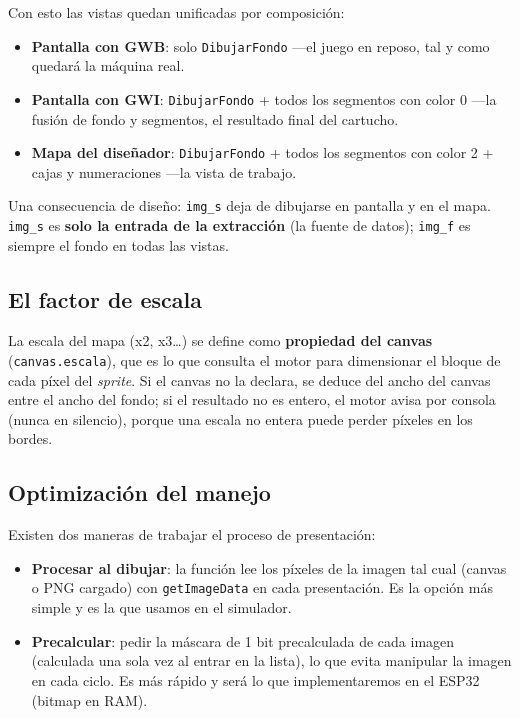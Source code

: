 Con esto las vistas quedan unificadas por composición:
\begin{itemize}
	\item \textbf{Pantalla con GWB}: solo \texttt{DibujarFondo} ---el juego en reposo, tal y como quedará la máquina real.
	\item \textbf{Pantalla con GWI}: \texttt{DibujarFondo} + todos los segmentos con color 0 ---la fusión de fondo y segmentos, el resultado final del cartucho.
	\item \textbf{Mapa del diseñador}: \texttt{DibujarFondo} + todos los segmentos con color 2 + cajas y numeraciones ---la vista de trabajo.
\end{itemize}

Una consecuencia de diseño: \texttt{img\_s} deja de dibujarse en pantalla y en el mapa. \texttt{img\_s} es \textbf{solo la entrada de la extracción} (la fuente de datos); \texttt{img\_f} es siempre el fondo en todas las vistas.

\subsection{El factor de escala}

La escala del mapa (x2, x3\dots) se define como \textbf{propiedad del canvas} (\texttt{canvas.escala}), que es lo que consulta el motor para dimensionar el bloque de cada píxel del \textit{sprite}. Si el canvas no la declara, se deduce del ancho del canvas entre el ancho del fondo; si el resultado no es entero, el motor avisa por consola (nunca en silencio), porque una escala no entera puede perder píxeles en los bordes.

\subsection{Optimización del manejo}

Existen dos maneras de trabajar el proceso de presentación:

\begin{itemize}
	\item \textbf{Procesar al dibujar}: la función lee los píxeles de la imagen tal cual (canvas o PNG cargado) con \texttt{getImageData} en cada presentación. Es la opción más simple y es la que usamos en el simulador.
	\item \textbf{Precalcular}: pedir la máscara de 1 bit precalculada de cada imagen (calculada una sola vez al entrar en la lista), lo que evita manipular la imagen en cada ciclo. Es más rápido y será lo que implementaremos en el ESP32 (bitmap en RAM).
\end{itemize}

